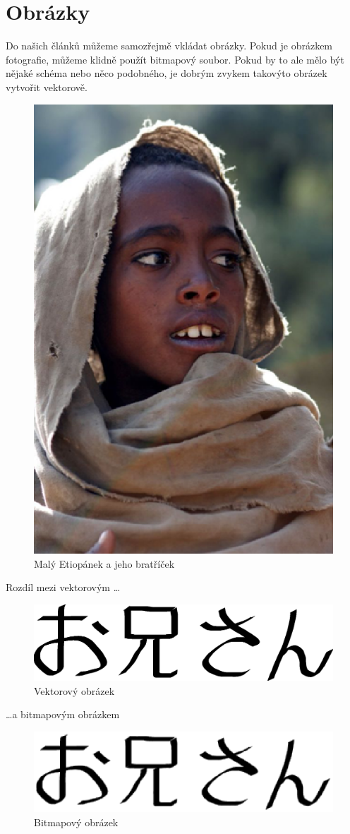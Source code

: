 \documentclass[a4paper,11pt]{article}
\begin{document}
\section{Obrázky}
Do našich článků můžeme samozřejmě vkládat obrázky. Pokud je obrázkem fotografie, můžeme klidně použít bitmapový soubor. Pokud by to ale mělo být nějaké schéma nebo něco podobného, je dobrým zvykem takovýto obrázek vytvořit vektorově.
\begin{figure}[h]
    \centering
    \includegraphics[width=0.25\linewidth]{etiopan.eps}
    \caption{Malý Etiopánek a jeho bratříček}
    \label{fig:etiopanek}
\end{figure}

\clearpage

Rozdíl mezi vektorovým \dots 
\begin{figure}[h]
    \centering
    \includegraphics[width=0.5\linewidth]{oniisan.eps}
    \caption{Vektorový obrázek}
    \label{fig:enter-label}
\end{figure}

\dots a bitmapovým obrázkem 
\begin{figure}[h]
    \centering
    \includegraphics[width=0.5\linewidth]{oniisan2.eps}
    \caption{Bitmapový obrázek}
    \label{fig:enter-label}
\end{figure}
\end{document}
